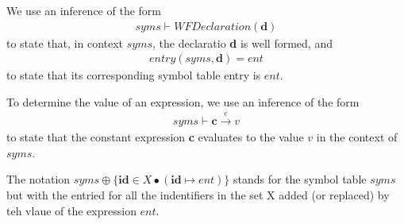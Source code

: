 We use an inference of the form
\begin{gather*}
    syms \vdash WFDeclaration(\textbf{d})
\end{gather*}
to state that, in context $syms$, the declaratio \textbf{d} is well
formed, and
\begin{gather*}
    entry(syms,\textbf{d}) = ent
\end{gather*}
to state that its corresponding symbol table entry is $ent$.

To determine the value of an expression, we use an inference of the form
\begin{gather*}
    syms \vdash \textbf{c} \xrightarrow{e} v
\end{gather*}
to state that the constant expression \textbf{c} evaluates to the value $v$ in the context 
of $syms$.

The notation $syms \oplus \{ \textbf{id} \in X \bullet (\textbf{id} \mapsto ent)\}$ 
stands for the symbol table $syms$ but with the entried for all the indentifiers in the set 
X added (or replaced) by teh vlaue of the expression $ent$.

